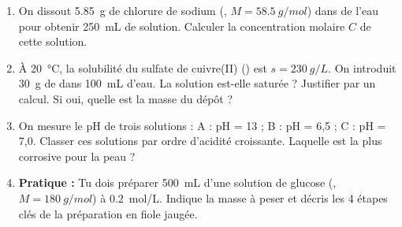 \documentclass[11pt]{article}
\begin{document}
\begin{exercice}
\begin{enumerate}
\item On dissout \SI{5,85}{g} de chlorure de sodium (, $M = \SI{58,5}{g/mol}$) dans de l'eau pour obtenir \SI{250}{mL} de solution. Calculer la concentration molaire $C$ de cette solution.
\item À \SI{20}{\celsius}, la solubilité du sulfate de cuivre(II) () est $s = \SI{230}{g/L}$. On introduit \SI{30}{g} de  dans \SI{100}{mL} d'eau. La solution est-elle saturée ? Justifier par un calcul. Si oui, quelle est la masse du dépôt ?
\item On mesure le pH de trois solutions : A : pH = 13 ; B : pH = 6,5 ; C : pH = 7,0. Classer ces solutions par ordre d'acidité croissante. Laquelle est la plus corrosive pour la peau ?
\item \textbf{Pratique :} Tu dois préparer \SI{500}{mL} d'une solution de glucose (, $M = \SI{180}{g/mol}$) à \SI{0,2}{mol/L}. Indique la masse à peser et décris les 4 étapes clés de la préparation en fiole jaugée.
\end{enumerate}
\end{exercice}
\end{document}

